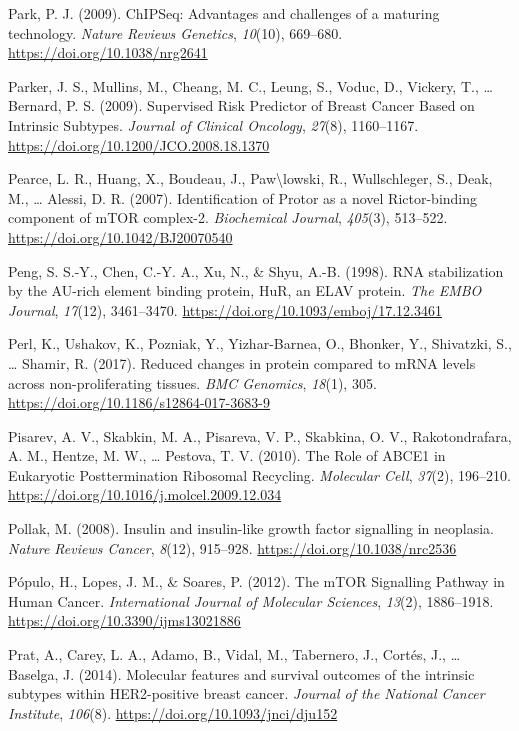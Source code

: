 \documentclass[12pt,openany]{book}
\begin{document}
\hypertarget{ref-Park2009}{}
Park, P. J. (2009). ChIPSeq: Advantages and challenges of a maturing
technology. \emph{Nature Reviews Genetics}, \emph{10}(10), 669--680.
\url{https://doi.org/10.1038/nrg2641}

\hypertarget{ref-Parker2009}{}
Parker, J. S., Mullins, M., Cheang, M. C., Leung, S., Voduc, D.,
Vickery, T., \ldots{} Bernard, P. S. (2009). Supervised Risk Predictor
of Breast Cancer Based on Intrinsic Subtypes. \emph{Journal of Clinical
Oncology}, \emph{27}(8), 1160--1167.
\url{https://doi.org/10.1200/JCO.2008.18.1370}

\hypertarget{ref-Pearce2007}{}
Pearce, L. R., Huang, X., Boudeau, J., Paw\textbackslash{}lowski, R.,
Wullschleger, S., Deak, M., \ldots{} Alessi, D. R. (2007).
Identification of Protor as a novel Rictor-binding component of mTOR
complex-2. \emph{Biochemical Journal}, \emph{405}(3), 513--522.
\url{https://doi.org/10.1042/BJ20070540}

\hypertarget{ref-Peng1998}{}
Peng, S. S.-Y., Chen, C.-Y. A., Xu, N., \& Shyu, A.-B. (1998). RNA
stabilization by the AU-rich element binding protein, HuR, an ELAV
protein. \emph{The EMBO Journal}, \emph{17}(12), 3461--3470.
\url{https://doi.org/10.1093/emboj/17.12.3461}

\hypertarget{ref-Perl2017}{}
Perl, K., Ushakov, K., Pozniak, Y., Yizhar-Barnea, O., Bhonker, Y.,
Shivatzki, S., \ldots{} Shamir, R. (2017). Reduced changes in protein
compared to mRNA levels across non-proliferating tissues. \emph{BMC
Genomics}, \emph{18}(1), 305.
\url{https://doi.org/10.1186/s12864-017-3683-9}

\hypertarget{ref-Pisarev2010}{}
Pisarev, A. V., Skabkin, M. A., Pisareva, V. P., Skabkina, O. V.,
Rakotondrafara, A. M., Hentze, M. W., \ldots{} Pestova, T. V. (2010).
The Role of ABCE1 in Eukaryotic Posttermination Ribosomal Recycling.
\emph{Molecular Cell}, \emph{37}(2), 196--210.
\url{https://doi.org/10.1016/j.molcel.2009.12.034}

\hypertarget{ref-Pollak2008}{}
Pollak, M. (2008). Insulin and insulin-like growth factor signalling in
neoplasia. \emph{Nature Reviews Cancer}, \emph{8}(12), 915--928.
\url{https://doi.org/10.1038/nrc2536}

\hypertarget{ref-Populo2012}{}
Pópulo, H., Lopes, J. M., \& Soares, P. (2012). The mTOR Signalling
Pathway in Human Cancer. \emph{International Journal of Molecular
Sciences}, \emph{13}(2), 1886--1918.
\url{https://doi.org/10.3390/ijms13021886}

\hypertarget{ref-Prat2014}{}
Prat, A., Carey, L. A., Adamo, B., Vidal, M., Tabernero, J., Cortés, J.,
\ldots{} Baselga, J. (2014). Molecular features and survival outcomes of
the intrinsic subtypes within HER2-positive breast cancer. \emph{Journal
of the National Cancer Institute}, \emph{106}(8).
\url{https://doi.org/10.1093/jnci/dju152}
\end{document}

